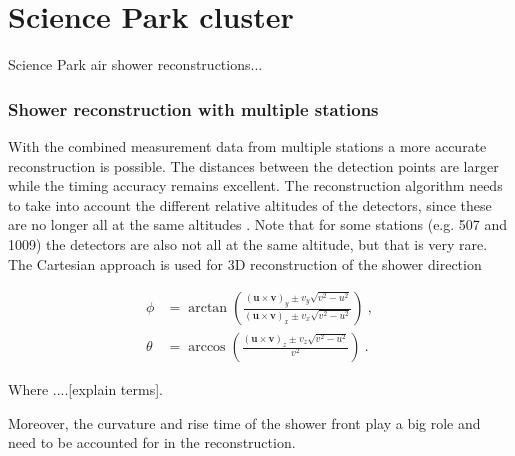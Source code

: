 \chapter{Science Park cluster}
\label{ch:spa}

Science Park air shower reconstructions...


\subsection{Shower reconstruction with multiple stations}

With the combined measurement data from multiple stations a more accurate reconstruction is possible. The distances between the detection points are larger while the timing accuracy remains excellent. The reconstruction algorithm needs to take into account the different relative altitudes of the detectors, since these are no longer all at the same altitudes \cite{steijger2012direction}. Note that for some stations (e.g. 507 and 1009) the detectors are also not all at the same altitude, but that is very rare. The Cartesian approach is used for 3D reconstruction of the shower direction \cite{montanus2015direction}

\begin{equation}
    \label{eq:direction3dflat}
    \begin{split}
        \phi &= \arctan \left(\frac{(\mathbf{u} \times \mathbf{v})_y \pm v_y \sqrt{v^2-u^2}}{(\mathbf{u} \times \mathbf{v})_x \pm v_x \sqrt{v^2-u^2}}\right) \ , \\
        \theta & = \arccos \left( \frac{(\mathbf{u} \times \mathbf{v})_z \pm v_z \sqrt{v^2-u^2}}{v^2}\right) \ .
    \end{split}
\end{equation}

Where ....[explain terms].

Moreover, the curvature and rise time of the shower front play a big role and need to be accounted for in the reconstruction.

